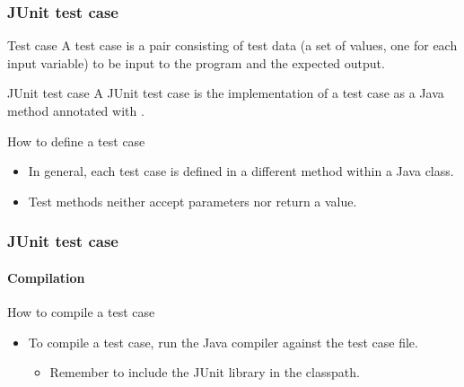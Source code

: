 \begin{frame}[parent={concept:junit}, hasprev=false, hasnext=true]
\frametitle{JUnit test case}
\label{concept:junit-test-case}
\label{concept:junit-testcase}


\begin{block:concept}{Test case}
A test case is a pair consisting of test data (a set of values, one for each
input variable) to be input to the program and the expected output.
\end{block:concept}

\begin{block:concept}{JUnit test case}
A JUnit test case is the implementation of a test case as a Java method
annotated with .
\end{block:concept}

\begin{block:fact}{How to define a test case}
\begin{itemize}
	\item In general, each test case is defined in a different method within a
	Java class.

	\item Test methods neither accept parameters nor return a value.
\end{itemize}
\end{block:fact}

\hfill
{}
\end{frame}



\begin{frame}[hasprev=true, hasnext=true]
\frametitle{JUnit test case}
\framesubtitle{Compilation}
\label{procedure:junit-test-case:compilation}

\begin{block:procedure}{How to compile a test case}
\begin{itemize}
	\item To compile a test case, run the Java compiler against the test case
	file.
	\begin{itemize}
		\item Remember to include the JUnit library in the classpath.
	\end{itemize}
\end{itemize}
\end{block:procedure}

\hfill
{}
\end{frame}



